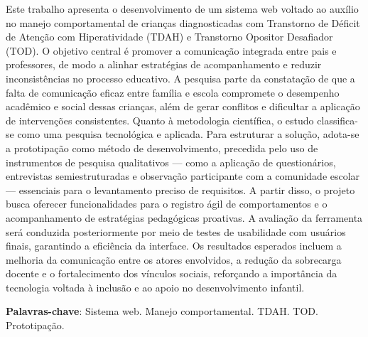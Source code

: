 
\begin{resumo}[RESUMO]

    \begin{SingleSpacing}
    
        Este trabalho apresenta o desenvolvimento de um sistema web voltado ao auxílio no manejo comportamental de crianças diagnosticadas com Transtorno de Déficit de Atenção com Hiperatividade (TDAH) e Transtorno Opositor Desafiador (TOD). O objetivo central é promover a comunicação integrada entre pais e professores, de modo a alinhar estratégias de acompanhamento e reduzir inconsistências no processo educativo. A pesquisa parte da constatação de que a falta de comunicação eficaz entre família e escola compromete o desempenho acadêmico e social dessas crianças, além de gerar conflitos e dificultar a aplicação de intervenções consistentes. Quanto à metodologia científica, o estudo classifica-se como uma pesquisa tecnológica e aplicada. Para estruturar a solução, adota-se a prototipação como método de desenvolvimento, precedida pelo uso de instrumentos de pesquisa qualitativos — como a aplicação de questionários, entrevistas semiestruturadas e observação participante com a comunidade escolar — essenciais para o levantamento preciso de requisitos. A partir disso, o projeto busca oferecer funcionalidades para o registro ágil de comportamentos e o acompanhamento de estratégias pedagógicas proativas. A avaliação da ferramenta será conduzida posteriormente por meio de testes de usabilidade com usuários finais, garantindo a eficiência da interface. Os resultados esperados incluem a melhoria da comunicação entre os atores envolvidos, a redução da sobrecarga docente e o fortalecimento dos vínculos sociais, reforçando a importância da tecnologia voltada à inclusão e ao apoio no desenvolvimento infantil.
        
        \item\textbf{Palavras-chave}: Sistema web. Manejo comportamental. TDAH. TOD. Prototipação.
    
    \end{SingleSpacing}
    
\end{resumo}
